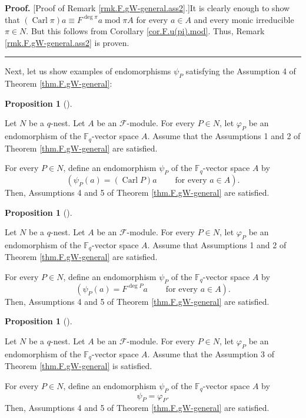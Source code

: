 \documentclass[numbers=enddot,12pt,final,onecolumn,notitlepage]{scrartcl}%
\theoremstyle{definition}
\newtheorem{prop}[theo]{Proposition}
\newenvironment{proposition}[1][]
{\begin{prop}[#1]\begin{leftbar}}
{\end{leftbar}\end{prop}}
\newenvironment{proof}[1][Proof]{\noindent\textbf{#1.} }{\ \rule{0.5em}{0.5em}}
\begin{document}
\begin{proof}
[Proof of Remark \ref{rmk.F.gW-general.ass2}.]It is clearly enough to show
that $\left(  \operatorname*{Carl}\pi\right)  a\equiv F^{\deg\pi
}a\operatorname{mod}\pi A$ for every $a\in A$ and every monic irreducible
$\pi\in N$. But this follows from Corollary \ref{cor.F.u(pi).mod}. Thus,
Remark \ref{rmk.F.gW-general.ass2} is proven.
\end{proof}

Next, let us show examples of endomorphisms $\psi_{P}$ satisfying the
Assumption 4 of Theorem \ref{thm.F.gW-general}:

\begin{proposition}
\label{prop.F.gW-general.ex1}Let $N$ be a $q$-nest. Let $A$ be an
$\mathcal{F}$-module. For every $P\in N$, let $\varphi_{P}$ be an endomorphism
of the $\mathbb{F}_{q}$-vector space $A$. Assume that the Assumptions 1 and 2
of Theorem \ref{thm.F.gW-general} are satisfied.

For every $P\in N$, define an endomorphism $\psi_{P}$ of the $\mathbb{F}_{q}%
$-vector space $A$ by%
\[
\left(  \psi_{P}\left(  a\right)  =\left(  \operatorname*{Carl}P\right)
a\ \ \ \ \ \ \ \ \ \ \text{for every }a\in A\right)  .
\]
Then, Assumptions 4 and 5 of Theorem \ref{thm.F.gW-general} are satisfied.
\end{proposition}

\begin{proposition}
\label{prop.F.gW-general.ex2}Let $N$ be a $q$-nest. Let $A$ be an
$\mathcal{F}$-module. For every $P\in N$, let $\varphi_{P}$ be an endomorphism
of the $\mathbb{F}_{q}$-vector space $A$. Assume that Assumptions 1 and 2 of
Theorem \ref{thm.F.gW-general} are satisfied.

For every $P\in N$, define an endomorphism $\psi_{P}$ of the $\mathbb{F}_{q}%
$-vector space $A$ by%
\[
\left(  \psi_{P}\left(  a\right)  =F^{\deg P}a\ \ \ \ \ \ \ \ \ \ \text{for
every }a\in A\right)  .
\]
Then, Assumptions 4 and 5 of Theorem \ref{thm.F.gW-general} are satisfied.
\end{proposition}

\begin{proposition}
\label{prop.F.gW-general.ex3}Let $N$ be a $q$-nest. Let $A$ be an
$\mathcal{F}$-module. For every $P\in N$, let $\varphi_{P}$ be an endomorphism
of the $\mathbb{F}_{q}$-vector space $A$. Assume that the Assumption 3 of
Theorem \ref{thm.F.gW-general} is satisfied.

For every $P\in N$, define an endomorphism $\psi_{P}$ of the $\mathbb{F}_{q}%
$-vector space $A$ by%
\[
\psi_{P}=\varphi_{P}.
\]
Then, Assumptions 4 and 5 of Theorem \ref{thm.F.gW-general} are satisfied.
\end{proposition}
\end{document}
